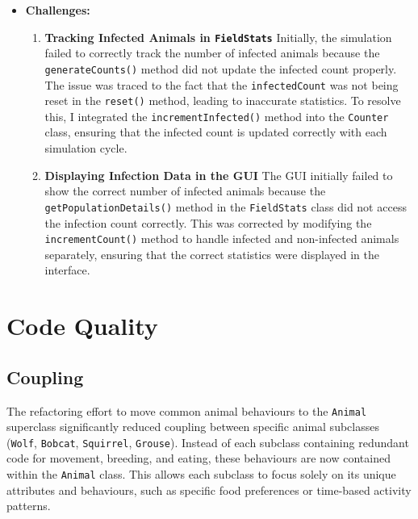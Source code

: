 \documentclass{article}
\begin{document}
\begin{itemize}
    \item \textbf{Challenges:}

    \begin{enumerate}
        \item \textbf{Tracking Infected Animals in \texttt{FieldStats}}
        Initially, the simulation failed to correctly track the number of infected animals because the \texttt{generateCounts()} method did not update the infected count properly.
        The issue was traced to the fact that the \texttt{infectedCount} was not being reset in the \texttt{reset()} method, leading to inaccurate statistics.
        To resolve this, I integrated the \texttt{incrementInfected()} method into the \texttt{Counter} class, ensuring that the infected count is updated correctly with each simulation cycle.

        \item \textbf{Displaying Infection Data in the GUI}
        The GUI initially failed to show the correct number of infected animals because the \texttt{getPopulationDetails()} method in the \texttt{FieldStats} class did not access the infection count correctly.
        This was corrected by modifying the \texttt{incrementCount()} method to handle infected and non-infected animals separately, ensuring that the correct statistics were displayed in the interface.
    \end{enumerate}

\end{itemize}


\section{Code Quality}

\subsection{Coupling}

The refactoring effort to move common animal behaviours to the \texttt{Animal} superclass significantly reduced coupling between specific animal subclasses (\texttt{Wolf}, \texttt{Bobcat}, \texttt{Squirrel}, \texttt{Grouse}). Instead of each subclass containing redundant code for movement, breeding, and eating, these behaviours are now contained within the \texttt{Animal} class. This allows each subclass to focus solely on its unique attributes and behaviours, such as specific food preferences or time-based activity patterns.
\end{document}
